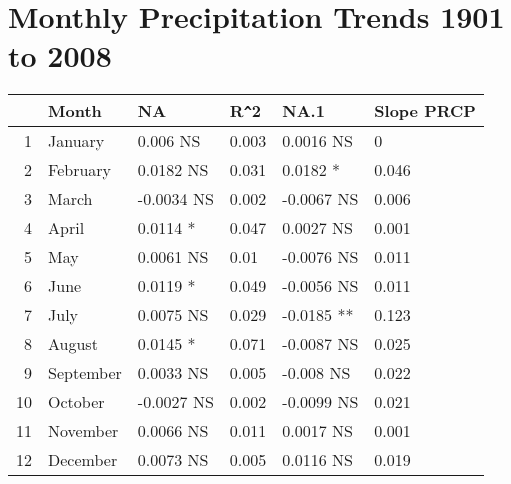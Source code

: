\documentclass{article}\usepackage[]{graphicx}\usepackage[]{color}
\begin{document}
\section*{Monthly Precipitation Trends 1901 to 2008}
\begin{table}[ht]
\centering
\begin{tabular}{rlllll}
  \hline
 & Month & NA & R\verb|^|2 & NA.1 & Slope PRCP \\ 
  \hline
1 & January & 0.006 NS & 0.003 & 0.0016 NS & 0 \\ 
  2 & February & 0.0182 NS & 0.031 & 0.0182 * & 0.046 \\ 
  3 & March & -0.0034 NS & 0.002 & -0.0067 NS & 0.006 \\ 
  4 & April & 0.0114 * & 0.047 & 0.0027 NS & 0.001 \\ 
  5 & May & 0.0061 NS & 0.01 & -0.0076 NS & 0.011 \\ 
  6 & June & 0.0119 * & 0.049 & -0.0056 NS & 0.011 \\ 
  7 & July & 0.0075 NS & 0.029 & -0.0185 ** & 0.123 \\ 
  8 & August & 0.0145 * & 0.071 & -0.0087 NS & 0.025 \\ 
  9 & September & 0.0033 NS & 0.005 & -0.008 NS & 0.022 \\ 
  10 & October & -0.0027 NS & 0.002 & -0.0099 NS & 0.021 \\ 
  11 & November & 0.0066 NS & 0.011 & 0.0017 NS & 0.001 \\ 
  12 & December & 0.0073 NS & 0.005 & 0.0116 NS & 0.019 \\ 
   \hline
\end{tabular}
\end{table}
\end{document}

